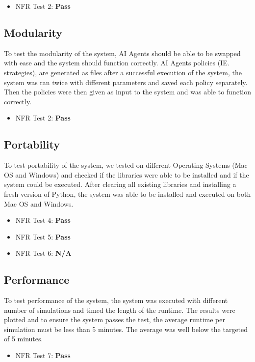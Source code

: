\documentclass[12pt, titlepage]{article}
\begin{document}
\begin{itemize}
    \item NFR Test 2: \textbf{Pass}
\end{itemize}

\subsection{Modularity}
To test the modularity of the system, AI Agents should be able to be swapped with ease and the system should function correctly. AI Agents policies (IE. strategies), are generated as files after a successful execution of the system, the system was ran twice with different parameters and saved each policy separately. Then the policies were then given as input to the system and was able to function correctly.
\begin{itemize}
    \item NFR Test 2: \textbf{Pass}
\end{itemize}

\subsection{Portability}
To test portability of the system, we tested on different Operating Systems (Mac OS and Windows) and checked if the libraries were able to be installed and if the system could be executed. After clearing all existing libraries and installing a fresh version of Python, the system was able to be installed and executed on both Mac OS and Windows.
\begin{itemize}
    \item NFR Test 4: \textbf{Pass}
    \item NFR Test 5: \textbf{Pass}
    \item NFR Test 6: \textbf{N/A}

\end{itemize}
\subsection{Performance}
To test performance of the system, the system was executed with different number of simulations and timed the length of the runtime. The results were plotted and to ensure the system passes the test, the average runtime per simulation must be less than 5 minutes. The average was well below the targeted of 5 minutes. 

\begin{itemize}
    \item NFR Test 7: \textbf{Pass}
\end{itemize}
\end{document}
